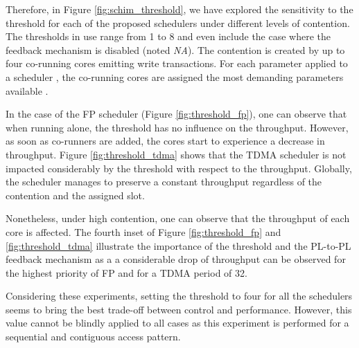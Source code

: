 Therefore, in Figure \ref{fig:schim_threshold}, we have explored the sensitivity
to the threshold for each of the proposed schedulers under different levels of contention.
The thresholds in use range from 1 to 8 and even include the case where the feedback mechanism is disabled
(noted \emph{NA}). The contention is created by up to four co-running cores emitting
write transactions. For each parameter applied to a scheduler , the co-running cores are assigned the most
demanding parameters available .

In the case of the FP scheduler (Figure \ref{fig:threshold_fp}), one can observe
that when running alone, the threshold has no influence on the throughput.
However, as soon as co-runners are added, the cores start to experience a
decrease in throughput.
Figure \ref{fig:threshold_tdma} shows that the TDMA scheduler is not impacted considerably by the threshold with respect to the throughput. Globally, the
scheduler manages to preserve a constant throughput regardless of the contention
and the assigned slot.

Nonetheless, under high
contention, one can observe that the throughput of each core is affected.
The fourth inset of Figure \ref{fig:threshold_fp} and \ref{fig:threshold_tdma}
illustrate the importance of the threshold and the PL-to-PL feedback mechanism as a
a considerable drop of throughput can be observed for the highest priority of FP
and for a TDMA period of 32.

Considering these experiments, setting the threshold to four for all the schedulers
seems to bring the best trade-off between control and performance. However, this
value cannot be blindly applied to all cases as this experiment is performed for
a sequential and contiguous access pattern.

